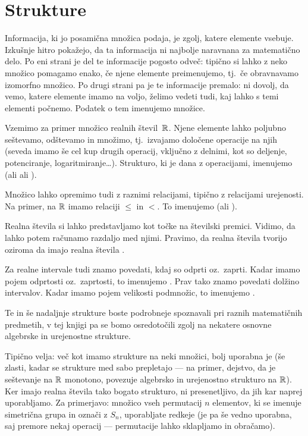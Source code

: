 \chapter{Strukture}


Informacija, ki jo posamična množica podaja, je zgolj, katere elemente vsebuje. Izkušnje hitro pokažejo, da ta informacija ni najbolje naravnana za matematično delo. Po eni strani je del te informacije pogosto odveč: tipično si lahko z neko množico pomagamo enako, če njene elemente preimenujemo, tj.~če obravnavamo izomorfno množico. Po drugi strani pa je te informacije premalo: ni dovolj, da vemo, katere elemente imamo na voljo, želimo vedeti tudi, kaj lahko s temi elementi počnemo. Podatek o tem imenujemo  množice.

Vzemimo za primer množico realnih števil~$\mathbb{R}$. Njene elemente lahko poljubno seštevamo, odštevamo in množimo, tj.~izvajamo določene operacije na njih (seveda imamo še cel kup drugih operacij, vključno z delnimi, kot so deljenje, potenciranje, logaritmiranje\ldots). Strukturo, ki je dana z operacijami, imenujemo  (ali  ali ).

Množico lahko opremimo tudi z raznimi relacijami, tipično z relacijami urejenosti. Na primer, na $\mathbb{R}$ imamo relaciji $\leq$ in $<$. To imenujemo  (ali ).

Realna števila si lahko predstavljamo kot točke na številski premici. Vidimo, da lahko potem računamo razdaljo med njimi. Pravimo, da realna števila tvorijo  oziroma da imajo realna števila .

Za realne intervale tudi znamo povedati, kdaj so odprti oz.~zaprti. Kadar imamo pojem odprtosti oz.~zaprtosti, to imenujemo . Prav tako znamo povedati dolžino intervalov. Kadar imamo pojem velikosti podmnožic, to imenujemo .

Te in še nadaljnje strukture boste podrobneje spoznavali pri raznih matematičnih predmetih, v tej knjigi pa se bomo osredotočili zgolj na nekatere osnovne algebrske in urejenostne strukture.

Tipično velja: več kot imamo strukture na neki množici, bolj uporabna je (še zlasti, kadar se strukture med sabo prepletajo --- na primer, dejstvo, da je seštevanje na $\mathbb{R}$ monotono, povezuje algebrsko in urejenostno strukturo na $\mathbb{R}$). Ker imajo realna števila tako bogato strukturo, ni presenetljivo, da jih kar naprej uporabljamo. Za primerjavo: množico vseh permutacij $n$ elementov, ki se imenuje simetrična grupa in označi z $S_n$, uporabljate redkeje (je pa še vedno uporabna, saj premore nekaj operacij --- permutacije lahko sklapljamo in obračamo).

